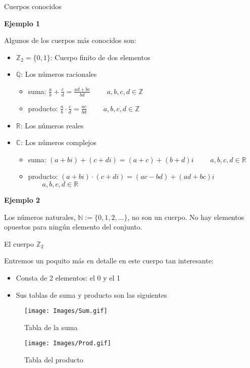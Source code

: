 \documentclass[
  ignorenonframetext,
]{beamer}
\providecommand{\tightlist}{%
  \setlength{\itemsep}{0pt}\setlength{\parskip}{0pt}}
\begin{document}
\begin{frame}{Cuerpos conocidos}
\protect\hypertarget{cuerpos-conocidos}{}

\textbf{Ejemplo 1}

Algunos de los cuerpos más conocidos son:

\begin{itemize}
\tightlist
\item
  \(\mathbb{Z}_2=\{0,1\}\): Cuerpo finito de dos elementos
\item
  \(\mathbb{Q}\): Los números racionales

  \begin{itemize}
  \tightlist
  \item
    suma: \(\frac{a}{b}+\frac{c}{d} = \frac{ad+bc}{bd}\)
    \(\qquad a,b,c,d\in\mathbb{Z}\)
  \item
    producto: \(\frac{a}{b}\cdot\frac{c}{d} = \frac{ac}{bd}\)
    \(\qquad a,b,c,d\in\mathbb{Z}\)
  \end{itemize}
\item
  \(\mathbb{R}\): Los números reales
\item
  \(\mathbb{C}\): Los números complejos

  \begin{itemize}
  \tightlist
  \item
    suma: \((a+bi)+(c+di) = (a+c)+(b+d)i\)
    \(\qquad a,b,c,d\in\mathbb{R}\)
  \item
    producto: \((a+bi)\cdot(c+di) = (ac-bd)+(ad+bc)i\)
    \(\qquad a,b,c,d\in\mathbb{R}\)
  \end{itemize}
\end{itemize}

\textbf{Ejemplo 2}

Los números naturales, \(\mathbb{N}:=\{0,1,2,...\}\), no son un cuerpo.
No hay elementos opuestos para ningún elemento del conjunto.

\end{frame}

\begin{frame}{El cuerpo \(\mathbb{Z}_2\)}
\protect\hypertarget{el-cuerpo-mathbbz_2}{}

Entremos un poquito más en detalle en este cuerpo tan interesante:

\begin{itemize}
\tightlist
\item
  Consta de 2 elementos: el 0 y el 1
\item
  Sus tablas de suma y producto son las siguientes
\end{itemize}

\begin{figure}
\centering
\texttt{[image: Images/Sum.gif]}
\caption{Tabla de la suma}
\end{figure}

\begin{figure}
\centering
\texttt{[image: Images/Prod.gif]}
\caption{Tabla del producto}
\end{figure}

\end{frame}
\end{document}
